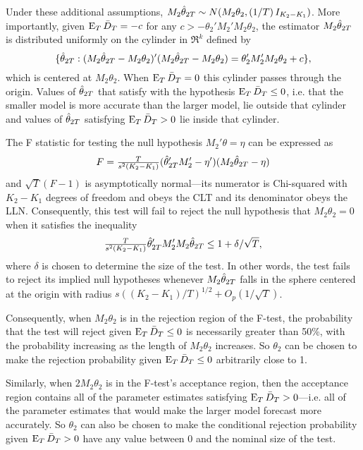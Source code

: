 Under these additional assumptions,
$M_2 \hat\theta_{2T} \sim N(M_2 \theta_2, (1/T) \, I_{K_2-K_1})$. More
importantly, given $\operatorname{E}_T \bar{D}_{T} = - c$ for any
$c > -\theta_2'M_2'M_2\theta_2$, the estimator $M_2 \hat\theta_{2T}$ is
distributed uniformly on the cylinder in $\Re^k$ defined by
\begin{equation*}
  \{\hat\theta_{2T} : (M_2 \hat\theta_{2T} - M_2 \theta_2)'(M_2 \hat\theta_{2T} - M_2 \theta_2) =
  \theta_2'M_2' M_2 \theta_2 + c\},
\end{equation*}
which is centered at $M_2\theta_2$. When $\operatorname{E}_T \bar{D}_{T} = 0$ this
cylinder passes through the origin.  Values of $\hat\theta_{2T}$ that satisfy
with the hypothesis $\operatorname{E}_T \bar{D}_{T} \leq 0$, i.e. that the smaller model
is more accurate than the larger model, lie outside that cylinder and
values of $\hat\theta_{2T}$ satisfying $\operatorname{E}_T \bar{D}_{T} > 0$ lie inside that
cylinder.

The F statistic for testing the null hypothesis $M_2'\theta = \eta$
can be expressed as
\begin{equation*}
  F = \tfrac{T}{s^2 (K_2 - K_1)} (\hat\theta_{2T}' M_2' - \eta') (M_2 \hat\theta_{2T} - \eta)
\end{equation*}
and $\sqrt{T}(F - 1)$ is asymptotically normal---its numerator is
Chi-squared with $K_2-K_1$ degrees of freedom and obeys the CLT and
its denominator obeys the LLN.
Consequently, this test will fail to reject the null hypothesis that
$M_2 \theta_2 = 0$ when it satisfies the inequality
\begin{equation}\label{eq:26}
  \tfrac{T}{s^2 (K_2 - K_1)} \hat\theta_{2T}' M_2' M_2 \hat\theta_{2T}
  \leq 1 + \delta / \sqrt{T},
\end{equation}
where $\delta$ is chosen to determine the size of the test. In other
words, the test fails to reject its implied null hypotheses whenever
$M_2 \hat\theta_{2T}$ falls in the sphere centered at the origin with radius
$s ((K_2 - K_1) / T)^{1/2} + O_p(1/\sqrt{T})$.

Consequently, when $M_2\theta_2$ is in the rejection region of the
F-test, the probability that the test will reject given
$\operatorname{E}_T \bar{D}_{T} \leq 0$ is necessarily greater than 50\%, with the
probability increasing as the length of $M_2\theta_2$ increases. So
$\theta_2$ can be chosen to make the rejection probability given
$\operatorname{E}_T \bar{D}_{T} \leq 0$ arbitrarily close to 1.

Similarly, when $2 M_2\theta_2$ is in the F-test's acceptance region,
then the acceptance region contains all of the parameter estimates
satisfying $\operatorname{E}_T \bar{D}_{T} > 0$---i.e. all of the parameter estimates that
would make the larger model forecast more accurately. So $\theta_2$
can also be chosen to make the conditional rejection probability given
$\operatorname{E}_T \bar{D}_{T} > 0$ have any value between $0$ and the nominal size of
the test.


